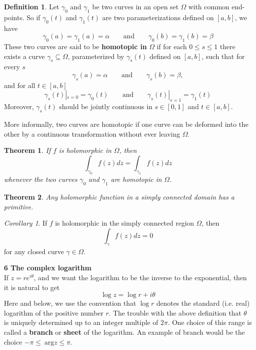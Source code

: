 \documentclass{article}
\newtheorem{theorem}{Theorem}
\theoremstyle{definition}
\newtheorem{definition}{Definition}[section]
\theoremstyle{remark}
\newtheorem{corollary}{Corollary}[theorem]
\begin{document}
    \begin{definition}
        Let $\gamma_0$ and $\gamma_1$ be two curves in an open set $\Omega$ with common end-points. So if $\gamma_0(t)$ and
        $\gamma_1(t)$ are two parameterizations defined on $[a,b]$, we have
        \[ \gamma_0(a) = \gamma_1(a) = \alpha \qquad\text{and}\qquad \gamma_0(b) = \gamma_1(b) = \beta \]
        These two curves are said to be \textbf{homotopic in} $\Omega$ if for each $0\leq s\leq 1$ there exists a curve 
        $\gamma_s \subseteq \Omega$, parameterized by $\gamma_s(t)$ defined on $[a,b]$, such that for every $s$
        \[ \gamma_s(a) = \alpha \qquad\text{and}\qquad \gamma_s(b) = \beta, \]
        and for all $t\in[a,b]$
        \[ \gamma_s(t)|_{s=0} = \gamma_0(t) \qquad\text{and}\qquad \gamma_s(t)|_{s=1} = \gamma_1(t) \]
        Moreover, $\gamma_s(t)$ should be jointly continuous in $s\in[0,1]$ and $t\in[a,b]$.
    \end{definition}

    More informally, two curves are homotopic if one curve can be deformed into the other by a continuous transformation without
    ever leaving $\Omega$.

    \begin{theorem}
        If $f$ is holomorphic in $\Omega$, then
        \[ \int_{\gamma_0} f(z)dz = \int_{\gamma_1} f(z)dz \]
        whenever the two curves $\gamma_0$ and $\gamma_1$ are homotopic in $\Omega$.
    \end{theorem}

    \begin{theorem}
        Any holomorphic function in a simply connected domain has a primitive.
    \end{theorem}

    \begin{corollary}
        If $f$ is holomorphic in the simply connected region $\Omega$, then
        \[ \int_{\gamma} f(z)dz = 0 \]
        for any closed curve $\gamma\in\Omega$.
    \end{corollary}

    \newpage

    \textbf{6 The complex logarithm}\\

    If $z=re^{i\theta}$, and we want the logarithm to be the inverse to the exponential, then it is natural to get
    \[ \log{z} = \log{r} + i\theta \]
    Here and below, we use the convention that $\log{r}$ denotes the standard (i.e. real) logarithm of the positive number $r$. The
    trouble with the above definition that $\theta$ is uniquely determined up to an integer multiple of $2\pi$. One choice of this
    range is called a \textbf{branch} or \textbf{sheet} of the logarithm. An example of branch would be the choice 
    $-\pi\leq\:\text{arg}z\leq \pi$.
\end{document}
